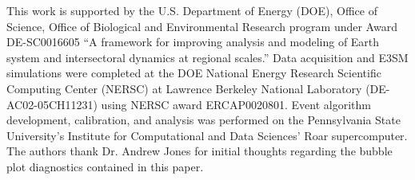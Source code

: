 \documentclass[nhess, manuscript]{copernicus}
\begin{document}

\begin{acknowledgements}
This work is supported by the U.S. Department of Energy (DOE), Office of Science, Office of Biological and Environmental Research program under Award DE-SC0016605 ``A framework for improving analysis and modeling of Earth system and intersectoral dynamics at regional scales.'' Data acquisition and E3SM simulations were completed at the DOE National Energy Research Scientific Computing Center (NERSC) at Lawrence Berkeley National Laboratory (DE-AC02-05CH11231) using NERSC award ERCAP0020801. Event algorithm development, calibration, and analysis was performed on the Pennsylvania State University's Institute for Computational and Data Sciences' Roar supercomputer. The authors thank Dr. Andrew Jones for initial thoughts regarding the bubble plot diagnostics contained in this paper.
\end{acknowledgements}


%
%




%
%
%
%
%
\end{document}
